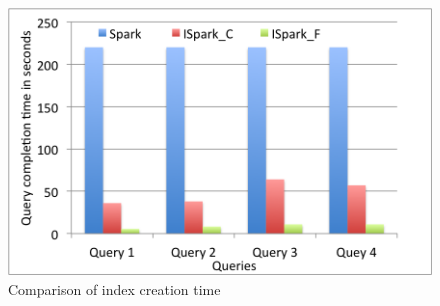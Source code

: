 \begin{figure}[!ht]
\caption{Comparison of index creation time}
\label{fig:exp9}
\includegraphics[scale=0.50]{./images/exp8.png}
\end{figure}
